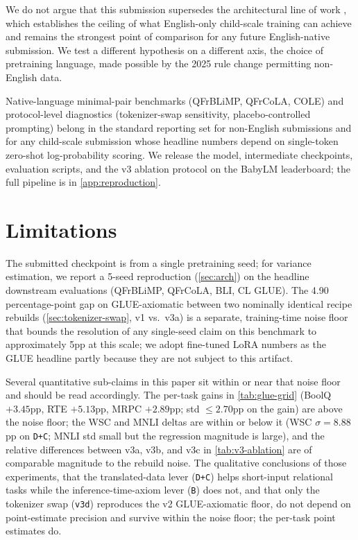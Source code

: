 \documentclass[11pt]{article}
\begin{document}
We do not argue that this submission supersedes the architectural line of work \citep{charpentier2023elcbert,charpentier2024gptbert}, which establishes the ceiling of what English-only child-scale training can achieve and remains the strongest point of comparison for any future English-native submission. We test a different hypothesis on a different axis, the choice of pretraining language, made possible by the 2025 rule change permitting non-English data.

Native-language minimal-pair benchmarks (QFrBLiMP, QFrCoLA, COLE) and protocol-level diagnostics (tokenizer-swap sensitivity, placebo-controlled prompting) belong in the standard reporting set for non-English submissions and for any child-scale submission whose headline numbers depend on single-token zero-shot log-probability scoring. We release the model, intermediate checkpoints, evaluation scripts, and the v3 ablation protocol on the BabyLM leaderboard; the full pipeline is in \autoref{app:reproduction}.

\section*{Limitations}
\label{sec:limitations}

The submitted checkpoint is from a single pretraining seed; for variance estimation, we report a 5-seed reproduction (\autoref{sec:arch}) on the headline downstream evaluations (QFrBLiMP, QFrCoLA, BLI, CL GLUE). The 4.90 percentage-point gap on GLUE-axiomatic between two nominally identical recipe rebuilds (\autoref{sec:tokenizer-swap}, v1 vs.\ v3a) is a separate, training-time noise floor that bounds the resolution of any single-seed claim on this benchmark to approximately 5pp at this scale; we adopt fine-tuned LoRA numbers as the GLUE headline partly because they are not subject to this artifact.

Several quantitative sub-claims in this paper sit within or near that noise floor and should be read accordingly. The per-task gains in \autoref{tab:glue-grid} (BoolQ $+3.45$pp, RTE $+5.13$pp, MRPC $+2.89$pp; std $\le\!2.70$pp on the gain) are above the noise floor; the WSC and MNLI deltas are within or below it (WSC $\sigma\!=\!8.88$pp on \texttt{D+C}; MNLI std small but the regression magnitude is large), and the relative differences between v3a, v3b, and v3c in \autoref{tab:v3-ablation} are of comparable magnitude to the rebuild noise. The qualitative conclusions of those experiments, that the translated-data lever (\texttt{D+C}) helps short-input relational tasks while the inference-time-axiom lever (\texttt{B}) does not, and that only the tokenizer swap (\texttt{v3d}) reproduces the v2 GLUE-axiomatic floor, do not depend on point-estimate precision and survive within the noise floor; the per-task point estimates do.
\end{document}
